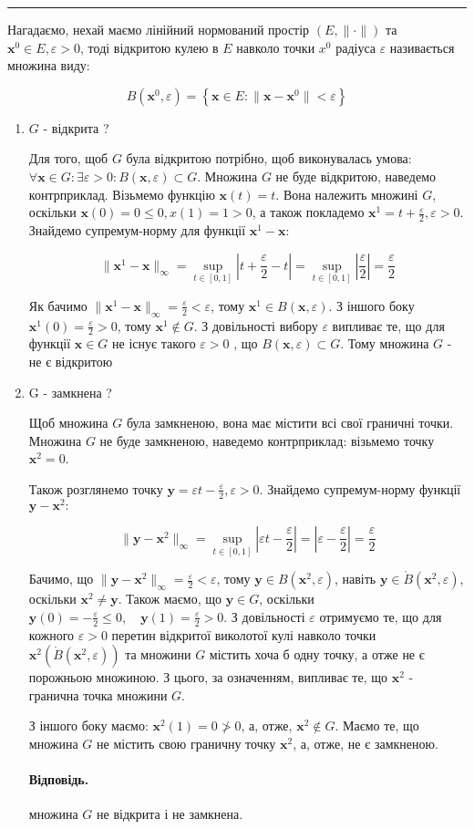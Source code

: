 \documentclass[a5paper, 20pt, titlepage]{article}
\newcommand{\x}{\textbf{x}}
\newcommand{\y}{\textbf{y}}
\newcommand{\e}{\varepsilon}
\begin{document}
\vspace{3mm}

\noindent\rule{4cm}{0.4pt}

Нагадаємо, нехай маємо лінійний нормований простір $(E, \| \cdot \|)$ та $\x^0 \in E, \e > 0$, тоді відкритою кулею в $E$ навколо точки $x^0$ радіуса $\e$ називається множина виду:

$$ B(\x^0, \e)  = \left\{ \x \in E: \| \x - \x^0 \| < \e \right\} $$    
\begin{enumerate}
\item $G$ - відкрита ?

Для того, щоб $G$ була відкритою потрібно, щоб виконувалась умова: $\forall \x \in G: \exists \varepsilon > 0: B(\x, \varepsilon) \subset G$. 
\newline Множина $G$ не буде відкритою, наведемо контрприклад. Візьмемо функцію $\x(t) = t$. Вона належить множині $G$, оскільки $\x(0) = 0 \leqslant 0, x(1) = 1 > 0$, а також покладемо $\x^1 = t + \frac{\e}{2}, \e > 0$. Знайдемо супремум-норму для функції $\x^1 - \x:$

$$ \| \x^1 - \x \|_\infty = \sup \limits_{t \in [0, 1]} \left|t + \frac{\e}{2} - t\right| = \sup \limits_{t \in [0, 1]} \left|\frac{\e}{2} \right| = \frac{\e}{2}$$

Як бачимо $\| \x^1 - \x \|_\infty = \frac{\e}{2} < \e$, тому $\x^1 \in B(\x, \e)$. З іншого боку $\x^1(0) = \frac{\e}{2} > 0$, тому $\x^1 \notin G$. З довільності вибору $\e$ випливає те, що для функції $\x \in G$ не існує такого $\e > 0$ , що $B(\x, \varepsilon) \subset G$. Тому множина $G$ - не є відкритою

\item G - замкнена ?

Щоб множина $G$ була замкненою, вона має містити всі свої граничні точки. Множина $G$ не буде замкненою, наведемо контрприклад: візьмемо точку $\x^2 = 0 $. 

Також розглянемо точку $\y = \e t - \frac{\e}{2}, \e > 0$. Знайдемо супремум-норму функції $ \y - \x^2 :$

$$\|\y - \x^2 \|_\infty =  \sup \limits_{t \in [0, 1]} \left| \e t - \frac{\e}{2} \right| = \left| \e - \frac{\e}{2} \right|= \frac{\e}{2}  $$

Бачимо, що $\| \y - \x^2\|_\infty = \frac{\e}{2} < \e$, тому $\y \in B(\x^2, \e)$, навіть $\y \in \mathring{B}(\x^2, \e)$, оскільки $\x^2 \neq \y.$ Також маємо, що $\y \in G$, оскільки $\y(0) = -\frac{\e}{2} \leqslant 0, \quad \y(1) = \frac{\e}{2} > 0$. З довільності $\e$ отримуємо те, що для кожного $\e > 0$ перетин відкритої виколотої кулі навколо точки $\x^2(\mathring{B}(\x^2, \e))$ та множини $G$ містить хоча б одну точку, а отже не є порожньою множиною. З цього, за означенням, випливає те, що $\x^2$ - гранична точка множини $G$. 

З іншого боку маємо: $\x^2(1) = 0 \not > 0$, а, отже, $\x^2 \notin G$.  Маємо те, що множина $G$ не містить свою граничну точку $\x^2$, а, отже, не є замкненою.

\vspace{4mm}
\paragraph{Відповідь.} множина $G$ не відкрита і не замкнена.

\end{enumerate}
\end{document}

